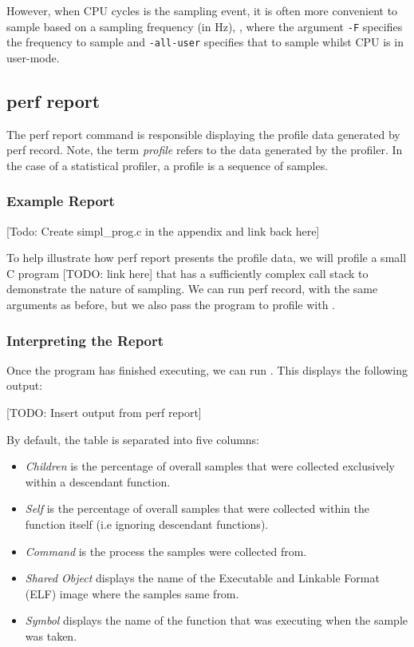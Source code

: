 However, when CPU cycles is the sampling event, it is often more convenient to sample based on a sampling frequency (in Hz), , where the argument \texttt{-F} specifies the frequency to sample and \texttt{-all-user} specifies that to sample whilst CPU is in user-mode. 

\subsection{perf report}

The perf report command is responsible displaying the profile data generated by perf record. Note, the term \textit{profile} refers to the data generated by the profiler. In the case of a statistical profiler, a profile is a sequence of samples.

\subsubsection{Example Report}

[Todo: Create simpl\_prog.c in the appendix and link back here]

To help illustrate how perf report presents the profile data, we will profile a small C program [TODO: link here] that has a sufficiently complex call stack to demonstrate the nature of sampling. We can run perf record, with the same arguments as before, but we also pass the program to profile with .

\subsubsection{Interpreting the Report}

Once the program has finished executing, we can run . This displays the following output:

[TODO: Insert output from perf report]

By default, the table is separated into five columns:

\ssp
\begin{itemize}
    \item \textit{Children} is the percentage of overall samples that were collected exclusively within a descendant function.
    \item \textit{Self} is the percentage of overall samples that were collected within the function itself (i.e ignoring descendant functions).
    \item \textit{Command} is the process the samples were collected from.
    \item \textit{Shared Object} displays the name of the Executable and Linkable Format (ELF) image where the samples same from.
    \item \textit{Symbol} displays the name of the function that was executing when the sample was taken.
\end{itemize}
\dsp

